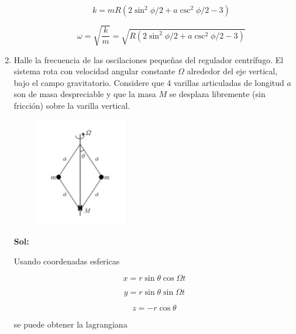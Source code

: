 \documentclass[12pt,a4paper]{article}
\begin{document}
\begin{enumerate}
\begin{enumerate}
    \begin{equation*}
        k = mR (2\sin^2{\phi/2} + a \csc^2{\phi/2} - 3)
    \end{equation*}
    
    \begin{equation*}
        \omega = \sqrt{\frac{k}{m}} = \sqrt{R(2\sin^2{\phi/2} + a \csc^2{\phi/2} - 3)}
    \end{equation*}
    
    
\end{enumerate}
    
    
    
    



\item Halle la frecuencia de las oscilaciones pequeñas del regulador centrífugo. El sistema rota con velocidad angular constante $\Omega$ alrededor del eje vertical, bajo el campo gravitatorio. Considere que 4 varillas articuladas de longitud $a$ son de masa despreciable y que la masa $M$ se desplaza libremente (sin fricción) sobre la varilla vertical.

\begin{figure}[h!]
    \centering
    \includegraphics{9.PNG}
\end{figure}

\textbf{Sol:}

Usando coordenadas esfericas

\begin{equation*}
    x  = r \sin{\theta} \cos{\Omega t}
\end{equation*}

\begin{equation*}
    y = r \sin{\theta} \sin{\Omega t}
\end{equation*}

\begin{equation*}
    z = - r \cos{\theta}
\end{equation*}

se puede obtener la lagrangiana


\end{enumerate}
\end{document}
